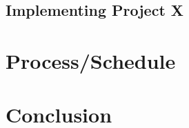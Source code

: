 \documentclass{article}
\begin{document}
\subsection*{Implementing Project X}



\section*{Process/Schedule}

\section*{Conclusion}




\end{document}
